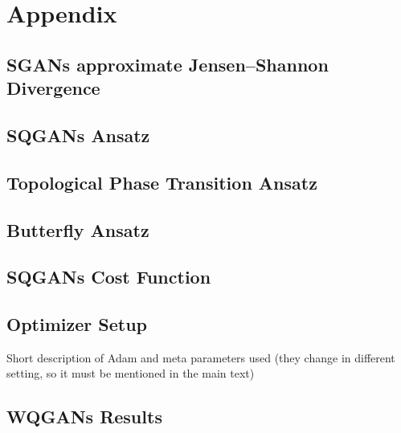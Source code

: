 \chapter{Appendix}

\section{SGANs approximate Jensen–Shannon Divergence}
\label{apx:JSD}




\section{SQGANs Ansatz}
\label{apx:sqgans_ansatz}


\section{Topological Phase Transition Ansatz}
\label{apx:topological_phase_transition_ansatz}

\section{Butterfly Ansatz}
\label{apx:butterfly_ansatz}

\section{SQGANs Cost Function}
\label{apx:sqgans_cost_function}

\section{Optimizer Setup}
\label{apx:optimizer_setup}
Short description of Adam and meta parameters used (they change in different
setting, so it must be mentioned in the main text)

\section{WQGANs Results}
